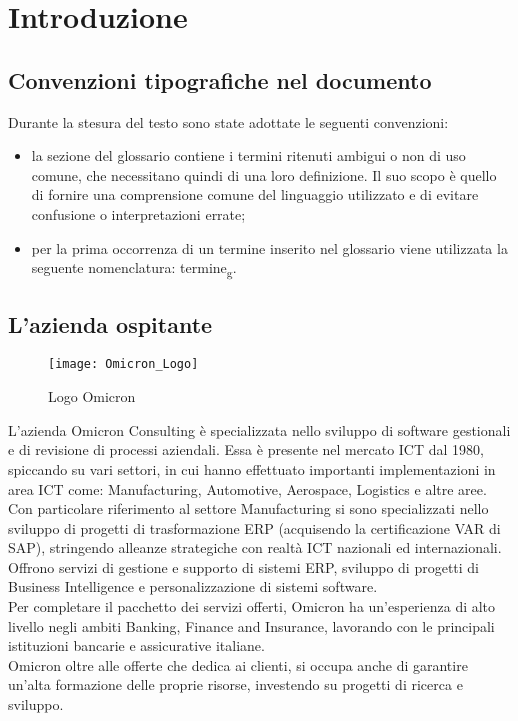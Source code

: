 \chapter{Introduzione}
\label{cap:introduzione}
\section{Convenzioni tipografiche nel documento}
Durante la stesura del testo sono state adottate le seguenti convenzioni:
\begin{itemize}
\item la sezione del glossario contiene i termini ritenuti ambigui o non di uso comune, che necessitano quindi di una loro definizione. Il suo scopo è quello di fornire una comprensione comune del linguaggio utilizzato e di evitare confusione o interpretazioni errate;
\item per la prima occorrenza di un termine inserito nel glossario viene utilizzata la seguente nomenclatura: termine\textsubscript{g}.\\
\end{itemize}

\section{L'azienda ospitante}

\begin{figure}[!h] 
    \centering 
    \texttt{[image: Omicron\_Logo]} 
    \caption{Logo Omicron}
\end{figure}

\noindent L’azienda Omicron Consulting è specializzata nello sviluppo di software gestionali e di revisione di processi aziendali. Essa è presente nel mercato ICT dal 1980, spiccando su vari settori, in cui hanno effettuato importanti implementazioni in area ICT come:  Manufacturing, Automotive, Aerospace, Logistics e altre aree.
Con particolare riferimento al settore Manufacturing si sono specializzati nello sviluppo di progetti di trasformazione ERP (acquisendo la certificazione VAR di SAP), stringendo alleanze strategiche con realtà ICT nazionali ed internazionali.\\
Offrono servizi di gestione e supporto di sistemi ERP, sviluppo di progetti di Business Intelligence e personalizzazione di sistemi software.\\
Per completare il pacchetto dei servizi offerti, Omicron ha un'esperienza di alto livello negli ambiti Banking, Finance and Insurance, lavorando con le principali istituzioni bancarie e assicurative italiane.\\
Omicron oltre alle offerte che dedica ai clienti, si occupa anche di garantire un'alta formazione delle proprie risorse, investendo su progetti di ricerca e sviluppo.

